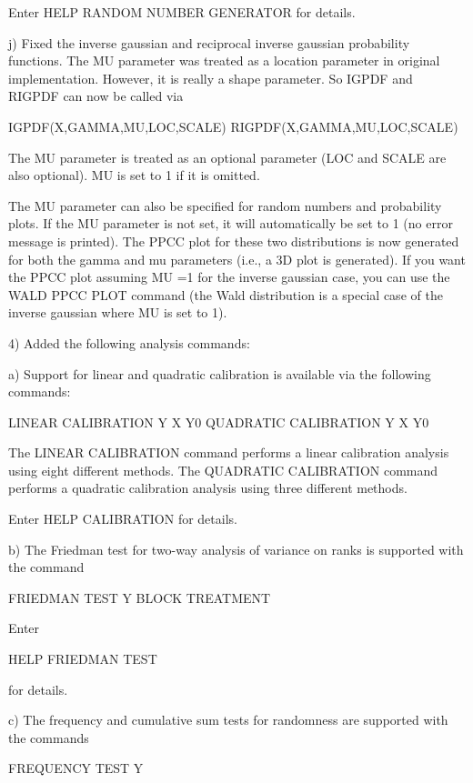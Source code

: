 {       Enter HELP RANDOM NUMBER GENERATOR for details.

    j) Fixed the inverse gaussian and reciprocal inverse gaussian
       probability functions.  The MU parameter was treated as a
       location parameter in original implementation.  However, it
       is really a shape parameter.  So IGPDF and RIGPDF can now be
       called via

           IGPDF(X,GAMMA,MU,LOC,SCALE)
           RIGPDF(X,GAMMA,MU,LOC,SCALE)

       The MU parameter is treated as an optional parameter (LOC and
       SCALE are also optional).  MU is set to 1 if it is omitted.

       The MU parameter can also be specified for random numbers
       and probability plots.  If the MU parameter is not set, it
       will automatically be set to 1 (no error message is printed).
       The PPCC plot for these two distributions is now generated for
       both the gamma and mu parameters (i.e., a 3D plot is generated).
       If you want the PPCC plot assuming MU =1 for the inverse
       gaussian case, you can use the WALD PPCC PLOT command (the
       Wald distribution is a special case of the inverse gaussian
       where MU is set to 1).

 4) Added the following analysis commands:

    a) Support for linear and quadratic calibration is available via
       the following commands:

          LINEAR CALIBRATION Y X Y0
          QUADRATIC CALIBRATION Y X Y0

       The LINEAR CALIBRATION command performs a linear calibration
       analysis using eight different methods.  The QUADRATIC
       CALIBRATION command performs a quadratic calibration analysis
       using three different methods.

       Enter HELP CALIBRATION for details.

    b) The Friedman test for two-way analysis of variance on ranks
       is supported with the command

          FRIEDMAN TEST Y BLOCK TREATMENT

       Enter 

          HELP FRIEDMAN TEST

       for details.

    c) The frequency and cumulative sum tests for randomness are
       supported with the commands

          FREQUENCY TEST Y

}
